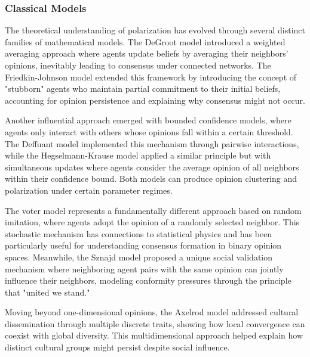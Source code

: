 \subsubsection{Classical Models}
The theoretical understanding of polarization has evolved through several distinct families of mathematical models. The DeGroot model \citep{degroot_reaching_1974} introduced a weighted averaging approach where agents update beliefs by averaging their neighbors' opinions, inevitably leading to consensus under connected networks. The Friedkin-Johnson model \citep{friedkin_social_1990} extended this framework by introducing the concept of "stubborn" agents who maintain partial commitment to their initial beliefs, accounting for opinion persistence and explaining why consensus might not occur.

Another influential approach emerged with bounded confidence models, where agents only interact with others whose opinions fall within a certain threshold. The Deffuant model \citep{deffuant_mixing_2000} implemented this mechanism through pairwise interactions, while the Hegselmann-Krause model \citep{hegselmann_opinion_2002} applied a similar principle but with simultaneous updates where agents consider the average opinion of all neighbors within their confidence bound. Both models can produce opinion clustering and polarization under certain parameter regimes.

The voter model \citep{holley_ergodic_1975} represents a fundamentally different approach based on random imitation, where agents adopt the opinion of a randomly selected neighbor. This stochastic mechanism has connections to statistical physics and has been particularly useful for understanding consensus formation in binary opinion spaces. Meanwhile, the Sznajd model \citep{sznajd-weron_opinion_2000} proposed a unique social validation mechanism where neighboring agent pairs with the same opinion can jointly influence their neighbors, modeling conformity pressures through the principle that "united we stand."

Moving beyond one-dimensional opinions, the Axelrod model \citep{axelrod_agent-based_2006} addressed cultural dissemination through multiple discrete traits, showing how local convergence can coexist with global diversity. This multidimensional approach helped explain how distinct cultural groups might persist despite social influence.

